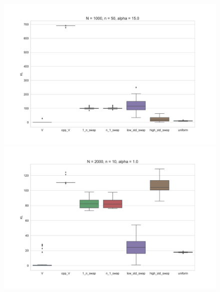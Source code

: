 \documentclass[11pt, oneside]{article}   	%
\begin{document}
\begin{figure}[h!]
\begin{minipage}[t]{.23\textwidth}
	\end{minipage}
	\hfill
	\begin{minipage}[t]{.23\textwidth}
		\centering
		\includegraphics[width=\textwidth]{figures/theorem2_2/N1000n50alpha15.pdf}
		
	\end{minipage} 


	\begin{minipage}[t]{.23\textwidth}
			\centering
			\includegraphics[width=\textwidth]{figures/theorem2_2/N2000n10alpha1.pdf}
			

\end{minipage}
\end{figure}
\end{document}
